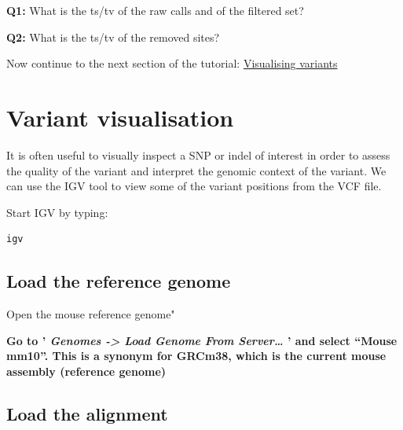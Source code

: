 \documentclass[11pt]{article}
\makeatletter
\newcommand{\boxspacing}{\kern\kvtcb@left@rule\kern\kvtcb@boxsep}
\newcommand{\prompt}[4]{

        {\ttfamily\llap{{\color{blue}\LARGE\faKeyboardO\hspace{3pt}#4}}\vspace{-\baselineskip}}
    }
\makeatother
\begin{document}
    \textbf{Q1:} What is the ts/tv of the raw calls and of the filtered set?

    \textbf{Q2:} What is the ts/tv of the removed sites?

    Now continue to the next section of the tutorial:
\href{visualisation.ipynb}{Visualising variants}





\newpage





    \hypertarget{variant-visualisation}{%
\section{Variant visualisation}\label{variant-visualisation}}

It is often useful to visually inspect a SNP or indel of interest in
order to assess the quality of the variant and interpret the genomic
context of the variant. We can use the IGV tool to view some of the
variant positions from the VCF file.

Start IGV by typing:

    \begin{tcolorbox}[breakable, size=fbox, boxrule=1pt, pad at break*=1mm,colback=cellbackground, colframe=cellborder]
\prompt{In}{incolor}{ }{\boxspacing}
\begin{Verbatim}[commandchars=\\\{\}]
igv
\end{Verbatim}
\end{tcolorbox}

    \hypertarget{load-the-reference-genome}{%
\subsection{Load the reference genome}\label{load-the-reference-genome}}

Open the mouse reference genome"

\textbf{Go to ' \textit{Genomes -\textgreater{} Load Genome From
Server\ldots{}} ' and select ``Mouse mm10''. This is a synonym for
GRCm38, which is the current mouse assembly (reference genome)}

    \hypertarget{load-the-alignment}{%
\subsection{Load the alignment}\label{load-the-alignment}}
\end{document}
